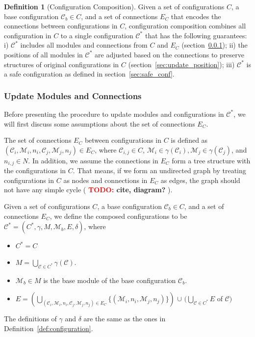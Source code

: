 \documentclass[conference]{IEEEtran}
\theoremstyle{definition}
\newtheorem{definition}{Definition}[section]
\newcommand{\TODO}[1]{ {\bf \textcolor{red}{TODO:} #1 }}
\begin{document}
\begin{definition}[Configuration Composition] 
Given a set of configurations $C$, a base configuration $\mathcal{C}_b\in C$, and a set of connections $E_C$ that encodes the connections between configurations in $C$, configuration composition combines all configuration in $C$ to a single configuration $\mathcal{C}^*$ that has the following guarantees: i) $\mathcal{C}^*$ includes all modules and connections from $C$ and $E_C$ (section~\ref{sec:update_connection}); ii) the positions of all modules in $\mathcal{C}^*$ are adjusted based on the connections to preserve structures of original configurations in $C$ (section~\ref{sec:update_position}); iii) $\mathcal{C}^*$ is a safe configuration as defined in section~\ref{sec:safe_conf}. 
\end{definition}

\subsubsection{Update Modules and Connections} \label{sec:update_connection}
Before presenting the procedure to update modules and configurations in $\mathcal{C}^*$, we will first discuss some assumptions about the set of connections $E_C$.

The set of connections $E_C$ between configurations in $C$ is defined as $(\mathcal{C}_i, \mathcal{M}_i, n_i, \mathcal{C}_j, \mathcal{M}_j, n_j) \in E_C$, where $\mathcal{C}_{i,j}\in C$, $\mathcal{M}_i \in \gamma(\mathcal{C}_i), \mathcal{M}_j \in \gamma(\mathcal{C}_j)$, and $n_{i,j} \in N$. In addition, we assume the connections in $E_C$ form a tree structure with the configurations in $C$. That means, if we form an undirected graph by treating configurations in $C$ as nodes and connections in $E_C$ as edges, the graph should not have any simple cycle (\TODO{cite, diagram?}).

Given a set of configurations $C$, a base configuration $\mathcal{C}_b\in C$, and a set of connections $E_C$, we define the composed configurations to be $\mathcal{C}^*=(C^*, \gamma, M, \mathcal{M}_b, E, \delta)$, where
\begin{itemize}
\item $C^*=C$
\item $M=\bigcup_{\mathcal{C}\in C^*}{\gamma(\mathcal{C})}$.
\item $\mathcal{M}_b\in M$ is the base module of the base configuration $\mathcal{C}_b$.
\item $E= (\bigcup_{(\mathcal{C}_i, \mathcal{M}_i, n_i, \mathcal{C}_j, \mathcal{M}_j, n_j)\in E_C}{\{(\mathcal{M}_i, n_i, \mathcal{M}_j, n_j)}\})$ $\cup$ $(\bigcup_{\mathcal{C} \in C^*}{E}$ of $\mathcal{C})$
\end{itemize}
The definitions of $\gamma$ and $\delta$ are the same as the ones in Definition~\ref{def:configuration}.
\end{document}
